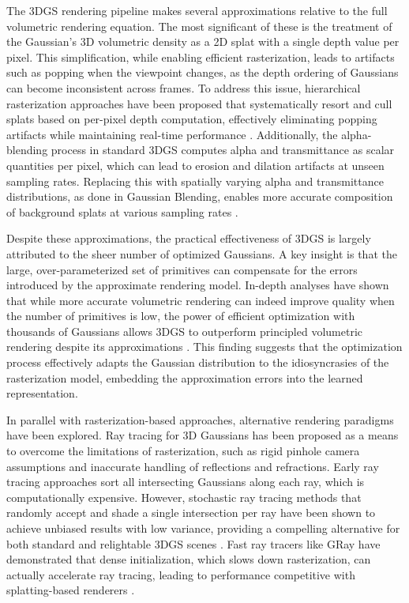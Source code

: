 \documentclass[11pt]{article}
\begin{document}
The 3DGS rendering pipeline makes several approximations relative to the full volumetric rendering equation. The most significant of these is the treatment of the Gaussian's 3D volumetric density as a 2D splat with a single depth value per pixel. This simplification, while enabling efficient rasterization, leads to artifacts such as popping when the viewpoint changes, as the depth ordering of Gaussians can become inconsistent across frames. To address this issue, hierarchical rasterization approaches have been proposed that systematically resort and cull splats based on per-pixel depth computation, effectively eliminating popping artifacts while maintaining real-time performance \cite{ref28}. Additionally, the alpha-blending process in standard 3DGS computes alpha and transmittance as scalar quantities per pixel, which can lead to erosion and dilation artifacts at unseen sampling rates. Replacing this with spatially varying alpha and transmittance distributions, as done in Gaussian Blending, enables more accurate composition of background splats at various sampling rates \cite{ref29}.

Despite these approximations, the practical effectiveness of 3DGS is largely attributed to the sheer number of optimized Gaussians. A key insight is that the large, over-parameterized set of primitives can compensate for the errors introduced by the approximate rendering model. In-depth analyses have shown that while more accurate volumetric rendering can indeed improve quality when the number of primitives is low, the power of efficient optimization with thousands of Gaussians allows 3DGS to outperform principled volumetric rendering despite its approximations \cite{ref7}. This finding suggests that the optimization process effectively adapts the Gaussian distribution to the idiosyncrasies of the rasterization model, embedding the approximation errors into the learned representation.

In parallel with rasterization-based approaches, alternative rendering paradigms have been explored. Ray tracing for 3D Gaussians has been proposed as a means to overcome the limitations of rasterization, such as rigid pinhole camera assumptions and inaccurate handling of reflections and refractions. Early ray tracing approaches sort all intersecting Gaussians along each ray, which is computationally expensive. However, stochastic ray tracing methods that randomly accept and shade a single intersection per ray have been shown to achieve unbiased results with low variance, providing a compelling alternative for both standard and relightable 3DGS scenes \cite{ref30}. Fast ray tracers like GRay have demonstrated that dense initialization, which slows down rasterization, can actually accelerate ray tracing, leading to performance competitive with splatting-based renderers \cite{ref31}.
\end{document}
